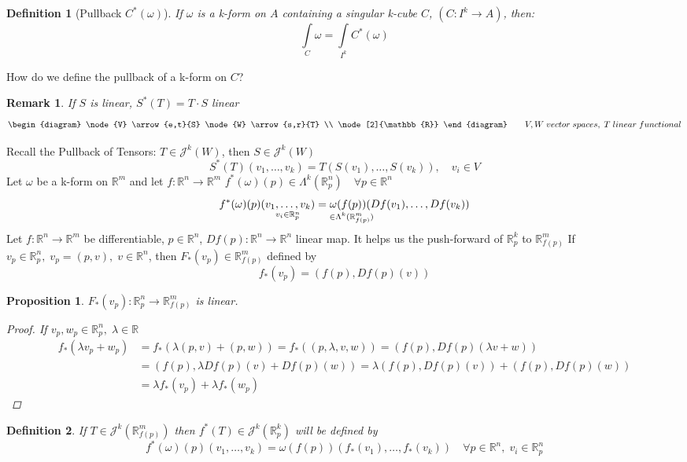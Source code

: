 \documentclass[11pt]{article}
\def\maj{\mathcal{J}}
\def\RR{\mathbb{R}}
\newtheorem{definition}{Definition}[section]
\newtheorem{proposition}{Proposition}[section]
\newtheorem*{remark}{Remark}
\begin{document}
\begin{definition}[Pullback  $C^*(\omega)$]
If $\omega$ is a k-form on $A$ containing a singular k-cube $C$, $(C:I^k \rightarrow A)$, then:
\[ \int\limits_{C} \omega = \int\limits_{I^k} C^*(\omega)\]
\end{definition}

How do we define the pullback of a k-form on $C$?
\begin{remark}
If $S$ is linear, $ S^*(T) = T \cdot S$ linear
\[
\begin{diagram}
\node{V} \arrow{e,t}{S}  
\node{W}  \arrow{s,r}{T} \\
 \node[2]{\RR}
\end{diagram}\qquad V,W \; vector\; spaces, \; T\;linear\; functional
\]
\end{remark}

Recall the Pullback of Tensors: $T \in \maj^k(W)$, then $S \in \maj^k(W)$
\[S^*(T)(v_1, \dots, v_k) = T(S(v_1), \dots, S(v_k)), \quad v_i \in V\]
Let $\omega$ be a k-form on $\RR^m$ and let $f:\RR^n \rightarrow \RR^m$ $f^*(\omega)(p) \in \Lambda^k(\RR_{p}^n)\quad \forall p \in \RR^n$
\[f^*(\omega)(p)(\underset{v_i \in \RR_{p}^n}{v_1, \dots, v_k}) = \omega(\underset{\mathclap{\in \Lambda^k(\RR_{f(p)}^m)}}{f(p)})(Df(v_1), \dots, Df(v_k))\]
Let $f:\RR^n \rightarrow \RR^m$ be differentiable, $p \in \RR^n$, $Df(p):\RR^n \rightarrow \RR^n$ linear map. It helps us the push-forward of $\RR_{p}^k$ to $\RR_{f(p)}^m$ If $v_{p} \in \RR_p^n, \; v_p = (p,v), \; v \in \RR^n$, then $F_*(v_p) \in \RR_{f(p)}^m$ defined by
\[f_*(v_p) = (f(p), Df(p)(v))\]



\begin{proposition}$F_*(v_p):\RR_p^n \rightarrow \RR_{f(p)}^m$ is linear.
\begin{proof}
 If $v_p, w_p \in \RR_p^n, \; \lambda \in \RR$ 
\begin{align*}
f_*(\lambda v_p + w_p) &= f_*(\lambda (p,v) + (p,w)) = f_*((p ,\lambda ,v ,w)) = (f(p), Df(p)(\lambda v +w))\\
&= (f(p), \lambda Df(p)( v) +Df(p)(w)) = \lambda (f(p), Df(p)( v) ) + (f(p), Df(p)(w) )\\
&=\lambda f_*(v_p) + \lambda f_*(w_p)
\end{align*}
\end{proof}
\end{proposition}

\begin{definition}
If $T \in \maj^k(\RR_{f(p)}^m)$ then $f^*(T) \in \maj^k(\RR_{p}^k)$ will be defined by
\[f^*(\omega)(p)(v_1, \dots, v_k) = \omega(f(p))(f_*(v_1), \dots, f_*(v_k)) \quad \forall p \in \RR^n, \; v_i \in \RR_p^n\]
\end{definition}
\end{document}
